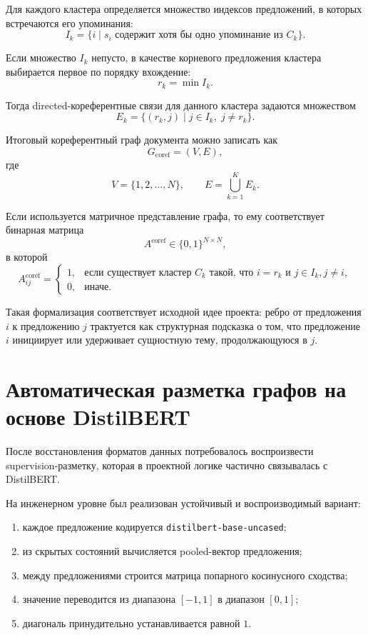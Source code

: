 \documentclass[12pt,a4paper]{article}
\begin{document}
Для каждого кластера определяется множество индексов предложений, в которых встречаются
его упоминания:
\[
I_k = \{ i \mid s_i \text{ содержит хотя бы одно упоминание из } C_k \}.
\]

Если множество $I_k$ непусто, в качестве корневого предложения кластера выбирается первое
по порядку вхождение:
\[
r_k = \min I_k.
\]

Тогда directed-кореферентные связи для данного кластера задаются множеством
\[
E_k = \{(r_k, j) \mid j \in I_k,\; j \neq r_k\}.
\]

Итоговый кореферентный граф документа можно записать как
\[
G_{\text{coref}} = (V, E),
\]
где
\[
V = \{1,2,\dots,N\}, \qquad E = \bigcup_{k=1}^{K} E_k.
\]

Если используется матричное представление графа, то ему соответствует бинарная матрица
\[
A^{\text{coref}} \in \{0,1\}^{N \times N},
\]
в которой
\[
A^{\text{coref}}_{ij} =
\begin{cases}
1, & \text{если существует кластер } C_k \text{ такой, что } i=r_k \text{ и } j \in I_k, j\neq i,\\
0, & \text{иначе.}
\end{cases}
\]

Такая формализация соответствует исходной идее проекта: ребро от предложения $i$ к
предложению $j$ трактуется как структурная подсказка о том, что предложение $i$
инициирует или удерживает сущностную тему, продолжающуюся в $j$.

\section{Автоматическая разметка графов на основе DistilBERT}

После восстановления форматов данных потребовалось воспроизвести supervision-разметку,
которая в проектной логике частично связывалась с DistilBERT.

На инженерном уровне был реализован устойчивый и воспроизводимый вариант:

\begin{enumerate}
    \item каждое предложение кодируется \texttt{distilbert-base-uncased};
    \item из скрытых состояний вычисляется pooled-вектор предложения;
    \item между предложениями строится матрица попарного косинусного сходства;
    \item значение переводится из диапазона $[-1,1]$ в диапазон $[0,1]$;
    \item диагональ принудительно устанавливается равной $1$.
\end{enumerate}
\end{document}
